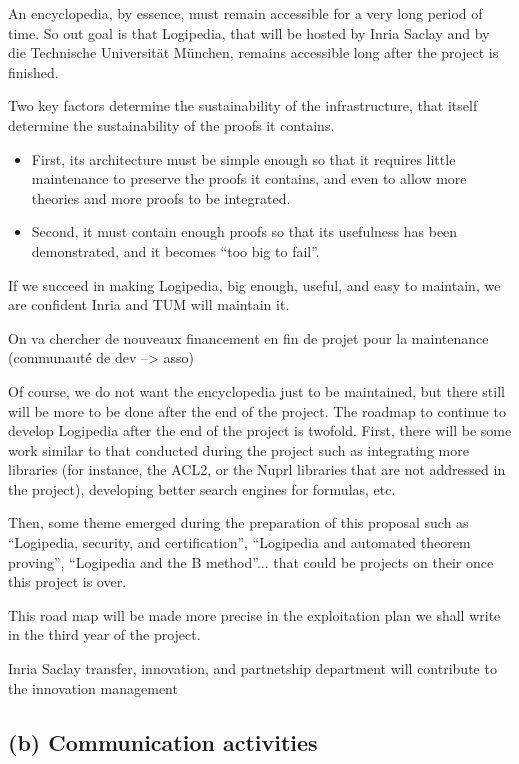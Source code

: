 An encyclopedia, by essence, must remain accessible for a very long
period of time. So out goal is that Logipedia, that will be hosted by
Inria Saclay and by die Technische Universität München, remains
accessible long after the project is finished. 

Two key factors determine the sustainability of the infrastructure,
that itself determine the sustainability of the proofs it contains.
\begin{itemize}
\item First, its architecture must be simple enough so that it requires
  little maintenance to preserve the proofs it contains, and even to
  allow more theories and more proofs to be integrated.
\item Second, it must contain enough proofs so that its usefulness has been
demonstrated, and it becomes ``too big to fail''.
\end{itemize} 

If we succeed in making Logipedia, big enough, useful, and easy to
maintain, we are confident Inria and TUM will maintain it.

{\color{red} On va chercher de nouveaux financement en fin de projet
  pour la maintenance (communauté de dev --> asso)}

Of course, we do not want the encyclopedia just to be maintained, but
there still will be more to be done after the end of the project. The
roadmap to continue to develop Logipedia after the end of the project
is twofold. First, there will be some work similar to that conducted
during the project such as integrating more libraries (for instance,
the ACL2, or the Nuprl libraries that are not addressed in the
project), developing better search engines for formulas, etc. 

Then, some theme emerged during the preparation of this proposal such
as ``Logipedia, security, and certification'', ``Logipedia and
automated theorem proving'', ``Logipedia and the B method''... that
could be projects on their once this project is over.

This road map will be made more precise in the exploitation plan 
we shall write in the third year of the project. 

{\color{red} Inria Saclay transfer, innovation, and partnetship
  department will contribute to the innovation management}


\subsection*{(b) Communication activities}

